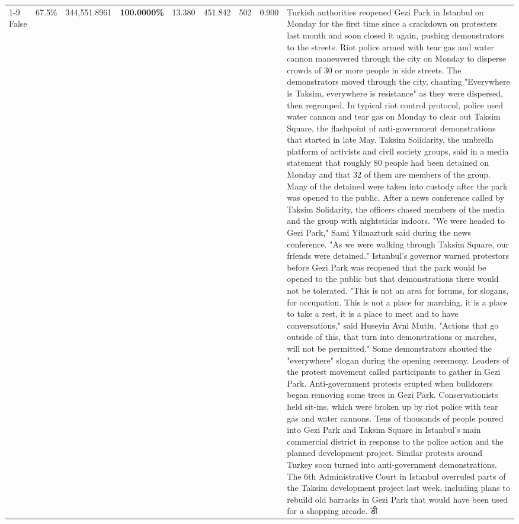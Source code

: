 \begin{table}[H]
\begin{tabular}{lllrlllll}
\cline{1-9}
False & 67.5\% & 344,551.8961 & \bfseries \color{red} 100.0000\% & 13.380 & 451.842 & 502 & 0.900 & Turkish authorities reopened Gezi Park in Istanbul on Monday for the first time since a crackdown on protesters last month and soon closed it again, pushing demonstrators to the streets. Riot police armed with tear gas and water cannon maneuvered through the city on Monday to disperse crowds of 30 or more people in side streets. The demonstrators moved through the city, chanting "Everywhere is Taksim, everywhere is resistance" as they were dispersed, then regrouped. In typical riot control protocol, police used water cannon and tear gas on Monday to clear out Taksim Square, the flashpoint of anti-government demonstrations that started in late May. Taksim Solidarity, the umbrella platform of activists and civil society groups, said in a media statement that roughly 80 people had been detained on Monday and that 32 of them are members of the group. Many of the detained were taken into custody after the park was opened to the public. After a news conference called by Taksim Solidarity, the officers chased members of the media and the group with nightsticks indoors. "We were headed to Gezi Park," Sami Yilmazturk said during the news conference. "As we were walking through Taksim Square, our friends were detained." Istanbul's governor warned protestors before Gezi Park was reopened that the park would be opened to the public but that demonstrations there would not be tolerated. "This is not an area for forums, for slogans, for occupation. This is not a place for marching, it is a place to take a rest, it is a place to meet and to have conversations," said Huseyin Avni Mutlu. "Actions that go outside of this, that turn into demonstrations or marches, will not be permitted." Some demonstrators shouted the "everywhere" slogan during the opening ceremony. Leaders of the protest movement called participants to gather in Gezi Park. Anti-government protests erupted when bulldozers began removing some trees in Gezi Park. Conservationists held sit-ins, which were broken up by riot police with tear gas and water cannons. Tens of thousands of people poured into Gezi Park and Taksim Square in Istanbul's main commercial district in response to the police action and the planned development project. Similar protests around Turkey soon turned into anti-government demonstrations. The 6th Administrative Court in Istanbul overruled parts of the Taksim development project last week, including plans to rebuild old barracks in Gezi Park that would have been used for a shopping arcade. डी \\

\end{tabular}
\end{table}
